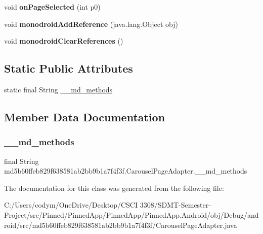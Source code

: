 \begin{DoxyCompactItemize}
void {\bfseries on\+Page\+Selected} (int p0)
\item 
\mbox{\label{classmd5b60ffeb829f638581ab2bb9b1a7f4f3f_1_1_carousel_page_adapter_a1f2a2b6fa20f43e6389b1ff39fbe3d49}} 
void {\bfseries monodroid\+Add\+Reference} (java.\+lang.\+Object obj)
\item 
\mbox{\label{classmd5b60ffeb829f638581ab2bb9b1a7f4f3f_1_1_carousel_page_adapter_a486afd9cefaf3f8e0ff4a0c65745b9bc}} 
void {\bfseries monodroid\+Clear\+References} ()
\end{DoxyCompactItemize}
\subsection*{Static Public Attributes}
\begin{DoxyCompactItemize}
\item 
static final String \hyperlink{classmd5b60ffeb829f638581ab2bb9b1a7f4f3f_1_1_carousel_page_adapter_aaf2a268eb1b8b79578e2ee7590f20521}{\+\_\+\+\_\+md\+\_\+methods}
\end{DoxyCompactItemize}


\subsection{Member Data Documentation}
\mbox{\label{classmd5b60ffeb829f638581ab2bb9b1a7f4f3f_1_1_carousel_page_adapter_aaf2a268eb1b8b79578e2ee7590f20521}} 
\subsubsection{\texorpdfstring{\+\_\+\+\_\+md\+\_\+methods}{\_\_md\_methods}}
{\footnotesize\ttfamily final String md5b60ffeb829f638581ab2bb9b1a7f4f3f.\+Carousel\+Page\+Adapter.\+\_\+\+\_\+md\+\_\+methods\hspace{0.3cm}{\ttfamily [static]}}



The documentation for this class was generated from the following file\+:\begin{DoxyCompactItemize}
\item 
C\+:/\+Users/codym/\+One\+Drive/\+Desktop/\+C\+S\+C\+I 3308/\+S\+D\+M\+T-\/\+Semester-\/\+Project/src/\+Pinned/\+Pinned\+App/\+Pinned\+App/\+Pinned\+App.\+Android/obj/\+Debug/android/src/md5b60ffeb829f638581ab2bb9b1a7f4f3f/Carousel\+Page\+Adapter.\+java\end{DoxyCompactItemize}
